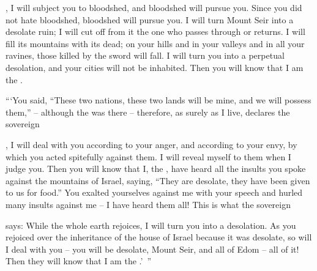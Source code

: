 {{}, I will subject
you to bloodshed,
and bloodshed
will pursue
you. Since
you did not
hate
bloodshed,
bloodshed
will pursue you.
I will turn
Mount
Seir
into a desolate
ruin;
I will cut off
from
it the one who passes
through or returns.
I will fill
its
mountains
with its dead;
on your hills
and in your valleys
and in all
your ravines,
those killed
by the sword
will fall.
I will turn you into a perpetual
desolation,
and your cities
will not
be inhabited.
Then you will know
that
I am
the {}.
\par }{\PP {}“‘You said,
“These
two
nations,
these two
lands
will be
mine, and we will possess them,” – although the
{} was there –
therefore,
as surely
as I
live, declares
the sovereign

{}, I will deal
with you according to your anger,
and according to your envy,
by which
you acted
spitefully
against them. I will reveal
myself to them when
I judge you.
Then you will know
that
I,
the {}, have heard
all
the insults
you spoke
against
the mountains
of Israel,
saying,
“They are desolate,
they have been given
to us for food.”
You exalted
yourselves against
me with your speech
and hurled
many insults
against me – I have heard them all!
This is what
the sovereign

{}
says: While
the whole
earth
rejoices,
I will turn you into a desolation.
As
you rejoiced
over
the inheritance
of the house
of Israel
because it was desolate,
so
will I deal with you – you will be desolate, Mount Seir, and all of Edom – all of it! Then they will know that I am the
{}.’ ”

\par }
